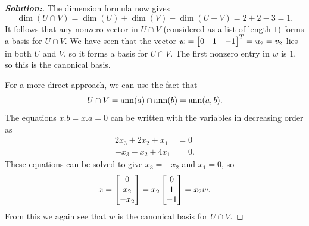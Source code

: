 \documentclass[a4paper]{amsart}
\theoremstyle{definition}
\newenvironment{solution}{\begin{proof}[\textbf{Solution:}] \vphantom{u}}{\end{proof}}
\begin{document}
\begin{solution}
 The dimension formula now gives
 \[ \dim(U\cap V) = \dim(U)+\dim(V)-\dim(U+V) = 2+2-3 = 1. \]
 It follows that any nonzero vector in $U\cap V$ (considered as a list
 of length $1$) forms a basis for $U\cap V$.  We have seen that the
 vector $w=\left[\begin{matrix} 0&1&-1\end{matrix}\right]^T=u_2=v_2$ lies in both $U$ and $V$, so it
 forms a basis for $U\cap V$.  The first nonzero entry in $w$ is $1$,
 so this is the canonical basis.

 For a more direct approach, we can use the fact that 
 \[ U\cap V = \operatorname{ann}(a)\cap\operatorname{ann}(b) = \operatorname{ann}(a,b). \]
 The equations $x.b=x.a=0$ can be written with the variables in
 decreasing order as
 \begin{align*}
  2x_3+2x_2+x_1 &= 0 \\
  -x_3-x_2+4x_1 &= 0.
 \end{align*}
 These equations can be solved to give $x_3=-x_2$ and $x_1=0$, so
 \[ x = \left[\begin{matrix} 0 \\ x_2 \\ -x_2 \end{matrix}\right] =
      x_2 \left[\begin{matrix} 0 \\ 1 \\ -1 \end{matrix}\right] = x_2w.
 \]
 From this we again see that $w$ is the canonical basis for $U\cap V$.
\end{solution}
\end{document}
